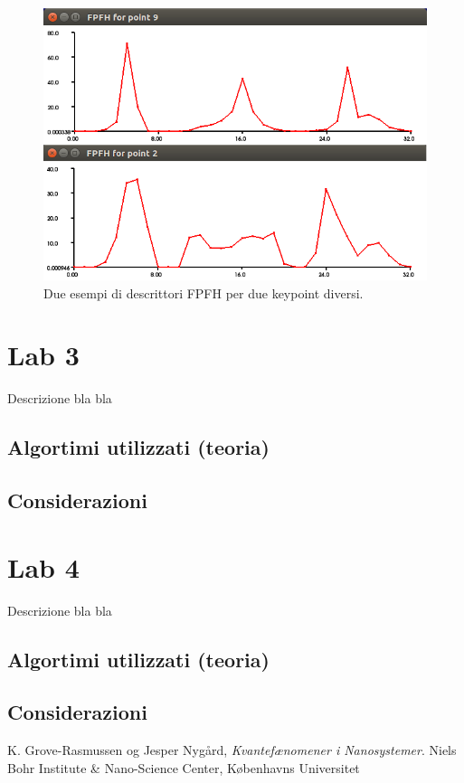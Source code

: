 \documentclass[a4paper]{article}
\begin{document}
	\begin{figure}
		\centering
		\includegraphics[width=1\textwidth]{images/lab2.png}
		\caption{\label{fig:lab2}Due esempi di descrittori FPFH per due keypoint diversi.}
	\end{figure}


\section{Lab 3} \label{sec:lab3}
Descrizione bla bla

	\subsection{Algortimi utilizzati (teoria)}

	\subsection{Considerazioni}


\section{Lab 4} \label{sec:lab4}
Descrizione bla bla

	\subsection{Algortimi utilizzati (teoria)}


	\subsection{Considerazioni}


\begin{thebibliography}{9}
  K. Grove-Rasmussen og Jesper Nygård,
  \emph{Kvantefænomener i Nanosystemer}.
  Niels Bohr Institute \& Nano-Science Center, Københavns Universitet

\end{thebibliography}
\end{document}
